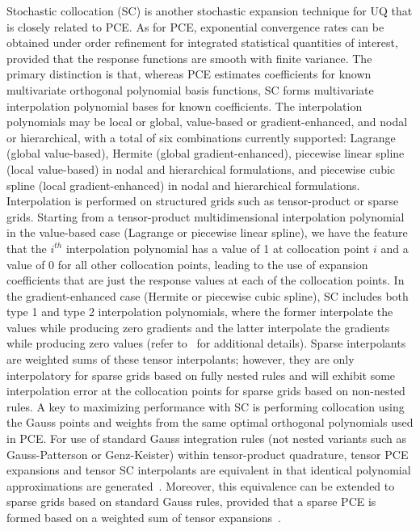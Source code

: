Stochastic collocation (SC) is another stochastic expansion technique
for UQ that is closely related to PCE. As for PCE, exponential
convergence rates can be obtained under order refinement for
integrated statistical quantities of interest, provided that the
response functions are smooth with finite variance. The primary
distinction is that, whereas PCE estimates coefficients for known
multivariate orthogonal polynomial basis functions, SC forms
multivariate interpolation polynomial bases for known coefficients.
The interpolation polynomials may be local or global, value-based or
gradient-enhanced, and nodal or hierarchical, with a total of six
combinations currently supported: Lagrange (global value-based),
Hermite (global gradient-enhanced), piecewise linear spline (local
value-based) in nodal and hierarchical formulations, and piecewise
cubic spline (local gradient-enhanced) in nodal and hierarchical
formulations. Interpolation is performed on structured grids such as
tensor-product or sparse grids. Starting from a tensor-product
multidimensional interpolation polynomial in the value-based case
(Lagrange or piecewise linear spline), we have the feature that the
$i^{th}$ interpolation polynomial has a value of 1 at collocation
point $i$ and a value of 0 for all other collocation points, leading
to the use of expansion coefficients that are just the response values
at each of the collocation points. In the gradient-enhanced case
(Hermite or piecewise cubic spline), SC includes both type 1 and type
2 interpolation polynomials, where the former interpolate the values
while producing zero gradients and the latter interpolate the
gradients while producing zero values (refer to~\cite{TheoMan} for
additional details). Sparse interpolants are weighted sums of these
tensor interpolants;
however, they are only interpolatory for sparse grids based on fully 
nested rules and will exhibit some interpolation error at the 
collocation points for sparse grids based on non-nested rules.
A key to maximizing performance with SC is performing collocation
using the Gauss points and weights from the same optimal orthogonal
polynomials used in PCE. 
For use of standard Gauss integration rules (not nested variants such
as Gauss-Patterson or Genz-Keister) within tensor-product quadrature,
tensor PCE expansions and tensor SC interpolants are equivalent in
that identical polynomial approximations are
generated~\cite{ConstTPQ}. Moreover, this equivalence can be extended
to sparse grids based on standard Gauss rules, provided that a sparse
PCE is formed based on a weighted sum of tensor expansions~\cite{ConstSSG}.


